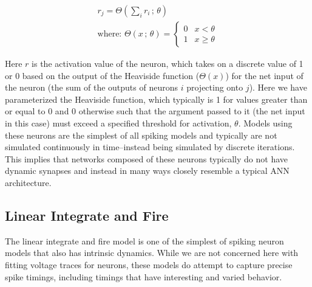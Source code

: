 \begin{eqnarray*}
	r_j= \Theta\left(\sum_{i} r_i\,;\, \theta\right) \\
	\text{where: } \Theta\left( x\,;\, \theta \right) = \begin{cases}
	0 & x < \theta\\
	1 & x \geq \theta
	\end{cases}
\end{eqnarray*}

Here $r$ is the activation value of the neuron, which takes on a discrete value of 1 or 0 based on the output of the Heaviside function ($\Theta(x)$) for the net input of the neuron (the sum of the outputs of neurons $i$ projecting onto $j$). Here we have parameterized the Heaviside function, which typically is 1 for values greater than or equal to 0 and 0 otherwise such that the argument passed to it (the net input in this case) must exceed a specified threshold for activation, $\theta$. Models using these neurons are the simplest of all spiking models and typically are not simulated continuously in time--instead being simulated by discrete iterations. This implies that networks composed of these neurons typically do not have dynamic synapses and instead in many ways closely resemble a typical ANN architecture. 

\subsection{Linear Integrate and Fire}

The linear integrate and fire model is one of the simplest of spiking neuron models that also has intrinsic dynamics. While we are not concerned here with fitting voltage traces for neurons, these models do attempt to capture precise spike timings, including timings that have interesting and varied behavior.

